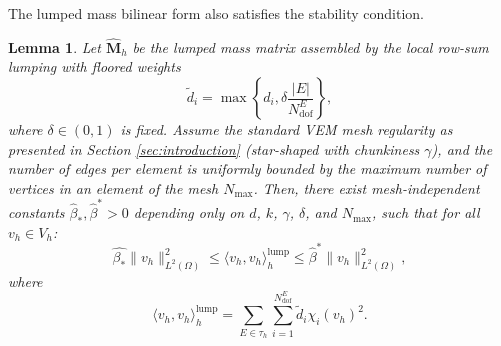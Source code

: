 \documentclass{article}
\newtheorem{lemma}{Lemma}[section]
\newcommand{\M}{\hat{\mathbf{M}}_h}
\newcommand{\numdofs}{N^E_{\text{dof}}}
\newcommand{\lebesguespace}[1]{L^2(#1)}
\begin{document}
The lumped mass bilinear form also satisfies the stability condition.
\begin{lemma}\label{lemma:lumped_mass_stability}
    Let $\M$ be the lumped mass matrix assembled by the local row-sum lumping with floored weights
    \begin{equation}\label{eq:floored_weights}
        \tilde{d}_i = \max \left\{ d_i, \delta \frac{|E|}{\numdofs} \right\},
    \end{equation}
    where $\delta \in (0,1)$ is fixed. Assume the standard VEM mesh regularity as presented in Section \ref{sec:introduction} (star-shaped with chunkiness $\gamma$), and the number of edges per element is uniformly bounded by the maximum number of vertices in an element of the mesh $N_{\max}$. Then, there exist mesh-independent constants $\hat{\beta}_*, \hat{\beta}^*>0$ depending only on $d$, $k$, $\gamma$, $\delta$, and $N_{\max}$, such that for all $v_h \in V_h$:
    \begin{equation}
    \nonumber
        \hat{\beta_*} \| v_h \|^2_{\lebesguespace{\Omega}} \leq \langle v_h, v_h \rangle^{\text{lump}}_h \leq \hat{\beta}^* \| v_h \|^2_{\lebesguespace{\Omega}},
    \end{equation} 
    where
    \begin{equation}
    \nonumber
        \langle v_h, v_h \rangle^{\text{lump}}_h = \sum \limits_{E \in \tau_h} \sum \limits^{\numdofs}_{i=1}\tilde{d}_i \chi_i(v_h)^2.
    \end{equation}
\end{lemma}
\end{document}
